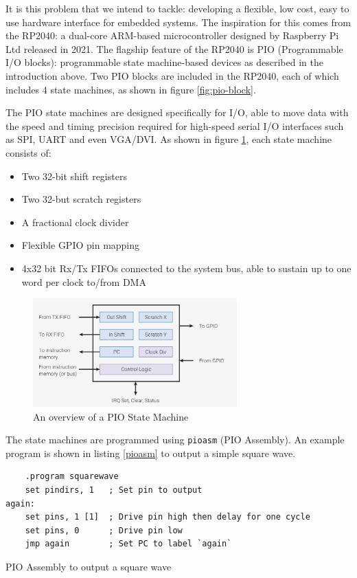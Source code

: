 \documentclass[a4paper,fleqn,12pt]{article}
\begin{document}
It is this problem that we intend to tackle: developing a flexible, low cost, easy to use hardware interface for embedded systems. The inspiration for this comes from the RP2040: a dual-core ARM-based microcontroller designed by Raspberry Pi Ltd released in 2021. The flagship feature of the RP2040 is PIO (Programmable I/O blocks): programmable state machine-based devices as described in the introduction above. Two PIO blocks are included in the RP2040, each of which includes 4 state machines, as shown in figure \ref{fig:pio-block}.

The PIO state machines are designed specifically for I/O, able to move data with the speed and timing precision required for high-speed serial I/O interfaces such as SPI, UART and even VGA/DVI. As shown in figure \ref{fig:pio-sm}, each state machine consists of:

\begin{itemize}
    \item Two 32-bit shift registers
    \item Two 32-but scratch registers
    \item A fractional clock divider
    \item Flexible GPIO pin mapping
    \item 4x32 bit Rx/Tx FIFOs connected to the system bus, able to sustain up to one word per clock to/from DMA
\end{itemize}

\begin{figure}[H]
    \centering
    \includegraphics[width=0.7\textwidth]{../img/rp2040-state-machine.png}
    \caption{An overview of a PIO State Machine \citep{rp2040}}
    \label{fig:pio-sm}
\end{figure}

The state machines are programmed using \texttt{pioasm} (PIO Assembly). An example program is shown in listing \ref{pioasm} to output a simple square wave.

\begin{listing}[b]
    \vspace{0.5cm}
    \begin{verbatim}
    .program squarewave
    set pindirs, 1   ; Set pin to output
again:
    set pins, 1 [1]  ; Drive pin high then delay for one cycle
    set pins, 0      ; Drive pin low
    jmp again        ; Set PC to label `again`
    \end{verbatim}
    \caption{PIO Assembly to output a square wave \citep{rp2040}}
    \label{pioasm}
\end{listing}
\end{document}
